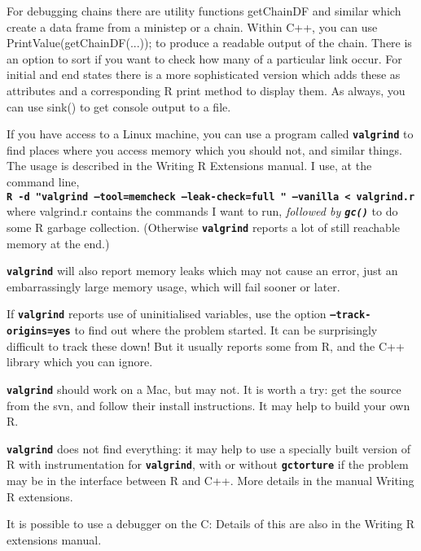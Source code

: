\documentclass[12pt, a4paper]{article}
\renewcommand{\=}{\,=\,}
\newcommand{\+}{\,+\,}
\newcommand{\sfn}[1]{\textbf{\texttt{#1}}}
\begin{document}
For debugging chains there are utility functions \textsf{getChainDF} and similar
which create a data frame from a ministep or a chain. Within C++, you can use
\textsf{PrintValue(getChainDF(...));} to produce a readable output of the
chain. There is an option to sort if you want to check how many of a particular
link occur. For initial and end states there is a more sophisticated version
which adds these as attributes and a corresponding R print method to display
them. As always, you can use sink() to get console output to a file.

If you have access to a Linux machine, you can use a program called
\sfn{valgrind} to find places where you access memory which you should not, and
similar things. The usage is described in the Writing R Extensions manual. I
use, at the command line,\\
\sfn{R -d "valgrind --tool=memcheck --leak-check=full " --vanilla < valgrind.r}
\\
where valgrind.r contains the commands I want to run, \emph{followed by
  \sfn{gc()}} to do some R garbage collection. (Otherwise \sfn{valgrind} reports
a lot of still reachable memory at the end.)

\sfn{valgrind} will also report memory leaks which may not cause an error, just
an embarrassingly large memory usage, which will fail sooner or later.

If \sfn{valgrind} reports use of uninitialised variables, use the option
\sfn{--track-origins=yes} to find out where the problem started. It can be
surprisingly difficult to track these down! But it usually reports some from R,
and the C++ library which you can ignore.

\sfn{valgrind} should work on a Mac, but may not. It is worth a try: get the
source from the svn, and follow their install instructions. It may help to build
your own R.

\sfn{valgrind} does not find everything: it may help to use a specially built
version of R with instrumentation for \sfn{valgrind}, with or without
\sfn{gctorture} if the problem may be in the interface between R and C++. More
details in the manual Writing R extensions.

It is possible to use a debugger on the C: Details of
this are also in the Writing R extensions manual.
\end{document}
